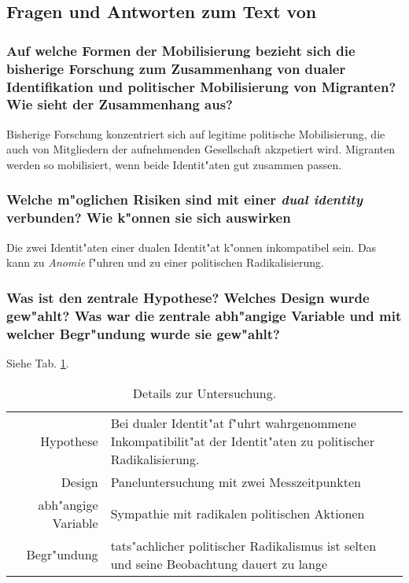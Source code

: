 \subsection{Fragen und Antworten zum Text von \textcite{simon_when_2013}}
\subsubsection{Auf welche Formen der Mobilisierung bezieht sich die bisherige Forschung zum Zusammenhang von dualer Identifikation und politischer Mobilisierung von Migranten? Wie sieht der Zusammenhang aus?}
Bisherige Forschung konzentriert sich auf legitime politische Mobilisierung, die auch von Mitgliedern der aufnehmenden Gesellschaft akzpetiert wird. Migranten werden so mobilisiert, wenn beide Identit"aten gut zusammen passen.

\subsubsection{Welche m"oglichen Risiken sind mit einer \emph{dual identity} verbunden? Wie k"onnen sie sich auswirken}
Die zwei Identit"aten einer dualen Identit"at k"onnen inkompatibel sein. Das kann zu \emph{Anomie} f"uhren und zu einer politischen Radikalisierung.

\subsubsection{Was ist den zentrale Hypothese? Welches Design wurde gew"ahlt? Was war die zentrale abh"angige Variable und mit welcher Begr"undung wurde sie gew"ahlt?}
Siehe Tab. \ref{tab:simon1}.
\begin{table}[h!]
        \centering
        \begin{tabular}{r p{10cm}}
                \hline
                Hypothese & Bei dualer Identit"at f"uhrt wahrgenommene Inkompatibilit"at der Identit"aten zu politischer Radikalisierung.\\
                Design & Paneluntersuchung mit zwei Messzeitpunkten\\
                abh"angige Variable & Sympathie mit radikalen politischen Aktionen\\
                Begr"undung & tats"achlicher politischer Radikalismus ist selten und seine Beobachtung dauert zu lange\\
                \hline
        \end{tabular}
        \caption{Details zur Untersuchung.}
        \label{tab:simon1}
\end{table}

